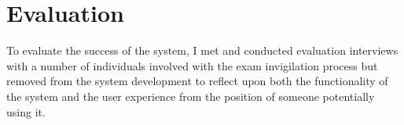 \chapter{Evaluation}

To evaluate the success of the system, I met and conducted evaluation interviews with a number of individuals involved with the exam invigilation process but removed from the system development to reflect upon both the functionality of the system and the user experience from the position of someone potentially using it.